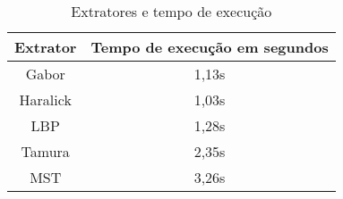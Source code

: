 \begin{table}[H]
    \centering
    \caption[Extratores e tempo de execução]{Extratores e tempo de execução
    \label{tab:extratorXtempoExecucao}}
    \begin{tabular}{cc}
        \toprule
            Extrator & Tempo de execução em segundos \\
        \midrule
            Gabor & 1,13s \\
            Haralick & 1,03s \\
            LBP & 1,28s \\
            Tamura & 2,35s \\
            MST & 3,26s \\
        \bottomrule
    \end{tabular}
\end{table}
